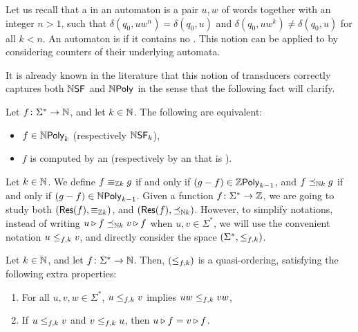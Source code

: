 \AP Let us recall that a  in an automaton is a pair $u,w$ of
words together with an integer $n > 1$, such that $\delta(q_0, uw^n) =
\delta(q_0, u)$ and $\delta(q_0, u w^k) \neq \delta(q_0, u)$ for all $k < n$.
An automaton is  if it contains no .
This notion can be applied to  by
considering counters of their underlying automata.

It is already known in the literature that this notion of transducers correctly
captures both $\NSF$ and $\NPoly$ in the sense that the following fact will
clarify.

\begin{fact}
    Let $f \colon \Sigma^* \to \Nat$, and let $k \in \Nat$.
    The following are equivalent:
    \begin{itemize}
        \item $f \in \NPoly[k]$ (respectively $\NSF[k]$),
        \item $f$ is computed by an 
            (respectively by an  that is 
            ).
    \end{itemize}
\end{fact}

\AP Let $k \in \Nat$. We define $f \zpolyequiv[k] g$ if and only if $(g - f)
\in \ZPoly[k-1]$, and $f \npolyleq[k] g$ if and only if $(g - f) \in
\NPoly[k-1]$. Given a function $f \colon \Sigma^* \to \Rel$, we are going to
study both $(\Res(f), \zpolyequiv[k])$, and $(\Res(f), \npolyleq[k])$. However,
to simplify notations, instead of writing $\app{f}{u} \npolyleq[k] \app{f}{v}$
when $u,v \in \Sigma^*$, we will use the convenient notation $u \resleq{f}{k}
v$, and directly consider the space $(\Sigma^*, \resleq{f}{k})$.

\begin{fact}
    \label{good-residual-ordering:fact}
    Let $k \in \Nat$, and let $f \colon \Sigma^* \to \Nat$. Then,
    $(\resleq{f}{k})$ is a quasi-ordering, satisfying the following
    extra properties:
    \begin{enumerate}
        \item For all $u,v,w \in \Sigma^*$, $u \resleq{f}{k} v$
            implies $uw \resleq{f}{k} vw$,
        \item If $u \resleq{f}{k} v$ and $v \resleq{f}{k} u$,
            then $\app{f}{u} = \app{f}{v}$.
    \end{enumerate}
\end{fact}

